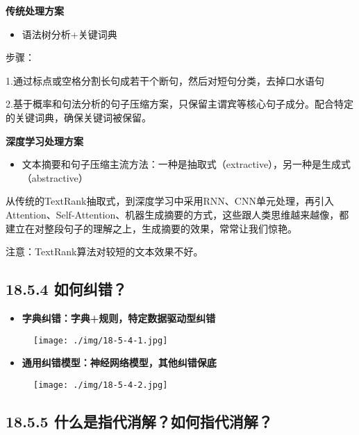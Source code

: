\textbf{传统处理方案}

\begin{itemize}
\item
  语法树分析+关键词典
\end{itemize}

步骤：

1.通过标点或空格分割长句成若干个断句，然后对短句分类，去掉口水语句

2.基于概率和句法分析的句子压缩方案，只保留主谓宾等核心句子成分。配合特定的关键词典，确保关键词被保留。

\textbf{深度学习处理方案}

\begin{itemize}
\item
  文本摘要和句子压缩主流方法：一种是抽取式（extractive），另一种是生成式（abstractive）
\end{itemize}

从传统的TextRank抽取式，到深度学习中采用RNN、CNN单元处理，再引入Attention、Self-Attention、机器生成摘要的方式，这些跟人类思维越来越像，都建立在对整段句子的理解之上，生成摘要的效果，常常让我们惊艳。

注意：TextRank算法对较短的文本效果不好。

\subsection{18.5.4 如何纠错？}\label{ux5982ux4f55ux7ea0ux9519}

\begin{itemize}
\item
  \textbf{字典纠错：字典+规则，特定数据驱动型纠错}
\end{itemize}

\begin{figure}
\centering
\texttt{[image: ./img/18-5-4-1.jpg]}
\caption{}
\end{figure}

\begin{itemize}
\item
  \textbf{通用纠错模型：神经网络模型，其他纠错保底}
\end{itemize}

\begin{figure}
\centering
\texttt{[image: ./img/18-5-4-2.jpg]}
\caption{}
\end{figure}

\subsection{18.5.5
什么是指代消解？如何指代消解？}\label{ux4ec0ux4e48ux662fux6307ux4ee3ux6d88ux89e3ux5982ux4f55ux6307ux4ee3ux6d88ux89e3}

